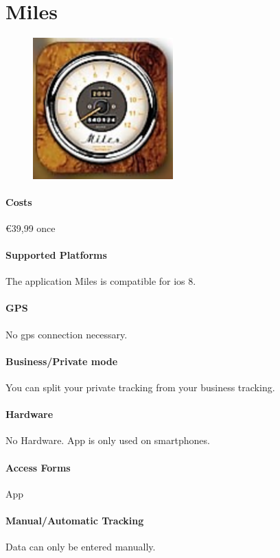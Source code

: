 \section{Miles}  
\begin{figure}
  \begin{center}
    \includegraphics[width=0.48\textwidth]{bilder/miles}
  \end{center}
\end{figure}
\paragraph{Costs} \euro 39,99 once
\paragraph{Supported Platforms} The application Miles is compatible for \gls{ios} 8.
\paragraph{GPS} No \gls{gps} connection necessary.
\paragraph{Business/Private mode} You can split your private tracking from your business tracking.
\paragraph{Hardware} No Hardware. App is only used on smartphones.
\paragraph{Access Forms} App
\paragraph{Manual/Automatic Tracking} Data can only be entered manually.
